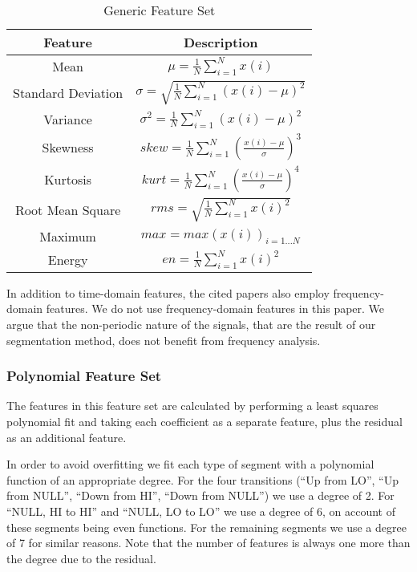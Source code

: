 \documentclass[conference]{IEEEtran}
\begin{document}
  \begin{table}
    \caption{Generic Feature Set}
    \label{tab:generic_feature_set}
    \centering
    \begin{tabular}{|c c|} 
      \hline
      Feature & Description \\ [0.5ex] 
      \hline\hline
      Mean & \(\mu = \frac{1}{N}\sum_{i=1}^{N}x(i)\) \\
      \hline
      Standard Deviation & \(\sigma = \sqrt{\frac{1}{N}\sum_{i=1}^{N}(x(i)-\mu)^2}\) \\
      \hline
      Variance & \(\sigma^2 = \frac{1}{N}\sum_{i=1}^{N}(x(i)-\mu)^2\) \\
      \hline
      Skewness & \(skew = \frac{1}{N} \sum_{i=1}^{N}(\frac{x(i)-\mu}{\sigma})^3\) \\
      \hline
      Kurtosis & \(kurt = \frac{1}{N} \sum_{i=1}^{N}(\frac{x(i)-\mu}{\sigma})^4\) \\
      \hline
      Root Mean Square & \(rms = \sqrt{\frac{1}{N}\sum_{i=1}^{N}x(i)^2}\) \\
      \hline
      Maximum & \(max = max(x(i))_{i=1...N}\) \\
      \hline
      Energy & \(en = \frac{1}{N}\sum_{i=1}^{N}x(i)^2\) \\
      \hline
    \end{tabular}
  \end{table}
  
  In addition to time-domain features, the cited papers also employ frequency-domain features. We do not use frequency-domain features in this paper. We argue that the non-periodic nature of the signals, that are the result of our segmentation method, does not benefit from frequency analysis.

\subsubsection{Polynomial Feature Set}
  The features in this feature set are calculated by performing a least squares polynomial fit and taking each coefficient as a separate feature, plus the residual as an additional feature.
  
  In order to avoid overfitting we fit each type of segment with a polynomial function of an appropriate degree. For the four transitions (``Up from LO'', ``Up from NULL'', ``Down from HI'', ``Down from NULL'') we use a degree of 2. For ``NULL, HI to HI'' and ``NULL, LO to LO'' we use a degree of 6, on account of these segments being even functions. For the remaining segments we use a degree of 7 for similar reasons. Note that the number of features is always one more than the degree due to the residual.
  
\end{document}
